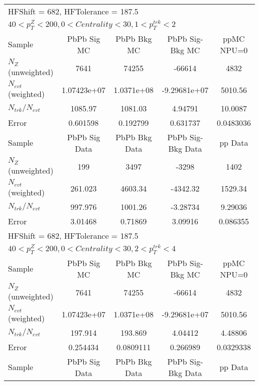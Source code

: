 \begin{table}[h!]
\centering
\begin{tabular}{|l|c|c|c|c|}
\multicolumn{5}{l}{ HFShift = 682, HFTolerance = 187.5}\\
\multicolumn{5}{l}{ $40 < p_{T}^{Z} < 200, 0 < Centrality < 30, 1 < p_{T}^{trk} < 2$}\\
\hline\hline
Sample         & PbPb Sig MC    & PbPb Bkg MC    & PbPb Sig-Bkg MC& ppMC NPU=0     \\
$N_Z$ (unweighted)& 7641           & 74255          & -66614         & 4832           \\
$N_{evt}$ (weighted)& 1.07423e+07    & 1.0371e+08     & -9.29681e+07   & 5010.56        \\
$N_{trk}/N_{evt}$& 1085.97        & 1081.03        & 4.94791        & 10.0087        \\
Error          & 0.601598       & 0.192799       & 0.631737       & 0.0483036      \\
\hline
Sample         & PbPb Sig Data  & PbPb Bkg Data  & PbPb Sig-Bkg Data& pp Data  \\
$N_Z$ (unweighted)& 199            & 3497           & -3298          & 1402           \\
$N_{evt}$ (weighted)& 261.023        & 4603.34        & -4342.32       & 1529.34        \\
$N_{trk}/N_{evt}$& 997.976        & 1001.26        & -3.28734       & 9.29036        \\
Error          & 3.01468        & 0.71869        & 3.09916        & 0.086355       \\
\hline\hline
\multicolumn{5}{l}{ HFShift = 682, HFTolerance = 187.5}\\
\multicolumn{5}{l}{ $40 < p_{T}^{Z} < 200, 0 < Centrality < 30, 2 < p_{T}^{trk} < 4$}\\
\hline\hline
Sample         & PbPb Sig MC    & PbPb Bkg MC    & PbPb Sig-Bkg MC& ppMC NPU=0     \\
$N_Z$ (unweighted)& 7641           & 74255          & -66614         & 4832           \\
$N_{evt}$ (weighted)& 1.07423e+07    & 1.0371e+08     & -9.29681e+07   & 5010.56        \\
$N_{trk}/N_{evt}$& 197.914        & 193.869        & 4.04412        & 4.48806        \\
Error          & 0.254434       & 0.0809111      & 0.266989       & 0.0329338      \\
\hline
Sample         & PbPb Sig Data  & PbPb Bkg Data  & PbPb Sig-Bkg Data& pp Data  \\

\end{tabular}
\end{table}
